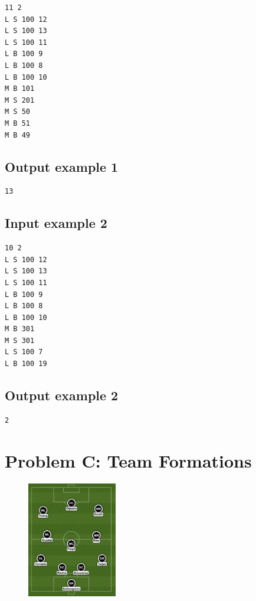 \documentclass[11pt]{report}
\begin{document}
\begin{verbatim}
11 2
L S 100 12
L S 100 13
L S 100 11
L B 100 9
L B 100 8
L B 100 10
M B 101
M S 201
M S 50
M B 51
M B 49
\end{verbatim}

\subsection*{Output example 1}

\begin{verbatim}
13
\end{verbatim}

\subsection*{Input example 2}

\begin{verbatim}
10 2
L S 100 12
L S 100 13
L S 100 11
L B 100 9
L B 100 8
L B 100 10
M B 301
M S 301
L S 100 7
L B 100 19
\end{verbatim}

\subsection*{Output example 2}

\begin{verbatim}
2
\end{verbatim}

\clearpage

\section*{Problem C: Team Formations}

\begin{figure}
  \centering
  \vspace{-15pt}
  \includegraphics[width=0.35\textwidth]{tactics.png}
\end{figure}
\end{document}
